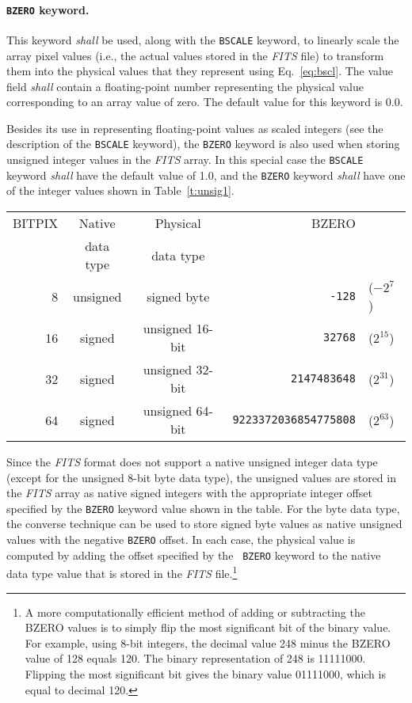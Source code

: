 \documentclass[onecolumn]{aa}
\begin{document}
  \paragraph{{\tt BZERO} keyword.}
  This keyword {\em shall} be used, along with the {\tt BSCALE}
 keyword, to linearly scale the array pixel values (i.e., the
 actual values stored in the {\em FITS\/} file) to transform them
 into the physical  values that they
 represent using Eq.~\ref{eq:bscl}. The value field {\em shall}
 contain a floating-point number representing the physical value
 corresponding to an array value of zero.  The default value for
 this  keyword is 0.0. 

 Besides its use in representing floating-point values as scaled
 integers (see the description of the {\tt BSCALE} keyword), 
 the {\tt BZERO} keyword is also used when storing unsigned integer
 values in the {\em FITS\/} array. In this special case the {\tt BSCALE} 
 keyword {\em shall}
 have the default value of 1.0, and the {\tt BZERO} keyword
 {\em shall} have one of the integer values shown in Table~\ref{t:unsig1}.
 
\begin{table*}
\centering
\caption{Usage of {\tt BZERO} to represent non-default integer data types.}
\label{t:unsig1}
\begin{tabular}{rccrl} 
\hline \hline
BITPIX & Native  & Physical & BZERO &   \\
 &  data type & data type &  &   \\
\hline
 8            & unsigned & signed byte     & {\tt -128}  &   ($-2^{7}$)       \\
 16           & signed   & unsigned 16-bit & {\tt 32768} & ($2^{15}$) \\
 32           & signed   & unsigned 32-bit & {\tt 2147483648} & ($2^{31}$) \\
 64           & signed   & unsigned 64-bit & {\tt 9223372036854775808} & ($2^{63}$) \\
\hline
\end{tabular}
\end{table*}

 Since the {\em FITS\/} format does not support a native unsigned integer data
 type (except for the unsigned 8-bit byte data type), 
 the unsigned values are stored in the {\em FITS\/} array as
 native signed integers with the appropriate integer offset specified by
 the {\tt BZERO} keyword value shown in the table. 
 For the byte data type, the converse technique can be used to
 store signed byte values as native unsigned values with the negative
 {\tt BZERO} offset.  
 In each case, the physical value
 is computed by adding the offset specified by the {\tt
 BZERO} keyword to the native data type value that is stored in the
 {\em FITS\/} file.\footnote{A more computationally efficient method of adding or subtracting
 the BZERO values is to simply flip the most significant bit of the binary value.  
 For example,
 using 8-bit integers, the decimal value 248 minus the BZERO value of 128  equals 120. The 
 binary representation of 248 is 11111000.  Flipping the most significant bit
 gives the binary value 01111000, which is equal to decimal 120.}
\end{document}
